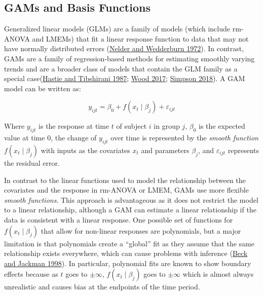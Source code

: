 \documentclass[
]{article}
\begin{document}
\hypertarget{gams-and-basis-functions}{%
\subsection{GAMs and Basis Functions}\label{gams-and-basis-functions}}

Generalized linear models (GLMs) are a family of models (which include rm-ANOVA and LMEMs) that fit a linear response function to data that may not have normally distributed errors (\protect\hyperlink{ref-nelder1972}{Nelder and Wedderburn 1972}). In contrast, GAMs are a family of regression-based methods for estimating smoothly varying trends and are a broader class of models that contain the GLM family as a special case(\protect\hyperlink{ref-hastie1987}{Hastie and Tibshirani 1987}; \protect\hyperlink{ref-wood2017}{Wood 2017}; \protect\hyperlink{ref-simpson2018}{Simpson 2018}). A GAM model can be written as:

\begin{equation}
  y_{ijt}=\beta_0+f(x_t\mid \beta_j)+\varepsilon_{ijt}
  \label{eq:GAM}
\end{equation}

Where \(y_{ijt}\) is the response at time \(t\) of subject \(i\) in group \(j\), \(\beta_0\) is the expected value at time 0, the change of \(y_{ijt}\) over time is represented by the \emph{smooth function} \(f(x_t\mid \beta_j)\) with inputs as the covariates \(x_t\) and parameters \(\beta_j\), and \(\varepsilon_{ijt}\) represents the residual error.

In contrast to the linear functions used to model the relationship between the covariates and the response in rm-ANOVA or LMEM, GAMs use more flexible \emph{smooth functions}. This approach is advantageous as it does not restrict the model to a linear relationship, although a GAM can estimate a linear relationship if the data is consistent with a linear response. One possible set of functions for \(f(x_t\mid \beta_j)\) that allow for non-linear responses are polynomials, but a major limitation is that polynomials create a ``global'' fit as they assume that the same relationship exists everywhere, which can cause problems with inference (\protect\hyperlink{ref-beck1998}{Beck and Jackman 1998}). In particular, polynomial fits are known to show boundary effects because as \(t\) goes to \(\pm \infty\), \(f(x_t \mid \beta_j)\) goes to \(\pm \infty\) which is almost always unrealistic and causes bias at the endpoints of the time period.
\end{document}
